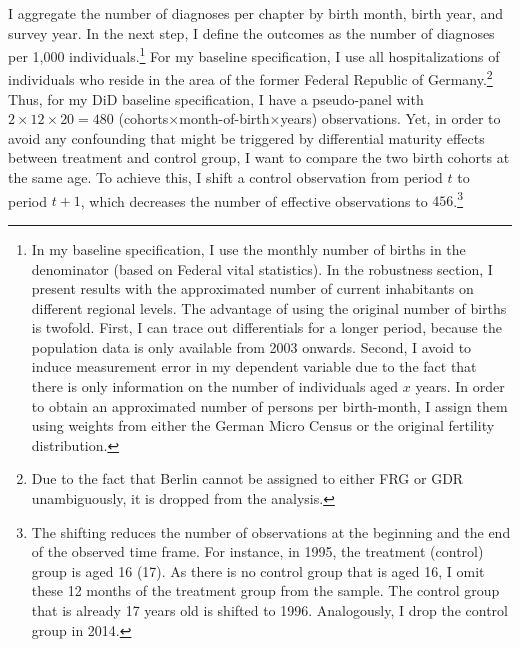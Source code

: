 \documentclass[11pt, a4paper]{article} %
\begin{document}
I aggregate the number of diagnoses per chapter by birth month, birth year, and survey year. In the next step, I define the outcomes as the number of diagnoses per 1,000 individuals.\footnote{In my baseline specification, I use the monthly number of births in the denominator (based on Federal vital statistics). In the robustness section, I present results with the approximated number of current inhabitants on different regional levels. The advantage of using the original number of births is twofold. First, I can trace out differentials for a longer period, because the population data is only available from 2003 onwards. Second, I avoid to induce measurement error in my dependent variable due to the fact that there is only information on the number of individuals aged $x$ years. In order to obtain an approximated number of persons per birth-month, I assign them using weights from either the German Micro Census or the original fertility distribution.} For my baseline specification, I use all hospitalizations of individuals who reside in the area of the former Federal Republic of Germany.\footnote{Due to the fact that Berlin cannot be assigned to either FRG or GDR unambiguously, it is dropped from the analysis.} Thus, for my DiD baseline specification, I have a pseudo-panel with $2\times12\times20=480$ (cohorts$\times$month-of-birth$\times$years) observations. Yet, in order to avoid any confounding that might be triggered by differential maturity effects between treatment and control group, I want to compare the two birth cohorts at the same age. To achieve this, I shift a control observation from period $t$ to period $t+1$, which decreases the number of effective observations to $456$.\footnote{The shifting reduces the number of observations at the beginning and the end of the observed time frame. For instance, in 1995, the treatment (control) group is aged 16 (17). As there is no control group that is aged 16, I omit these 12 months of the treatment group from the sample. The control group that is already 17 years old is shifted to 1996. Analogously, I drop the control group in 2014.} \newline %

\end{document}
